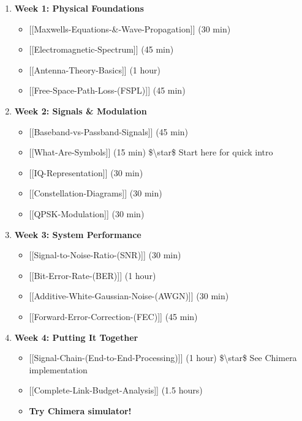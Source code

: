\begin{enumerate}
\def\labelenumi{\arabic{enumi}.}
\tightlist
\item
  \textbf{Week 1: Physical Foundations}

  \begin{itemize}
  \tightlist
  \item
    {[}{[}Maxwell\textquotesingle s-Equations-\&-Wave-Propagation{]}{]}
    (30 min)
  \item
    {[}{[}Electromagnetic-Spectrum{]}{]} (45 min)
  \item
    {[}{[}Antenna-Theory-Basics{]}{]} (1 hour)
  \item
    {[}{[}Free-Space-Path-Loss-(FSPL){]}{]} (45 min)
  \end{itemize}
\item
  \textbf{Week 2: Signals \& Modulation}

  \begin{itemize}
  \tightlist
  \item
    {[}{[}Baseband-vs-Passband-Signals{]}{]} (45 min)
  \item
    {[}{[}What-Are-Symbols{]}{]} (15 min) \$\textbackslash star\$ Start
    here for quick intro
  \item
    {[}{[}IQ-Representation{]}{]} (30 min)
  \item
    {[}{[}Constellation-Diagrams{]}{]} (30 min)
  \item
    {[}{[}QPSK-Modulation{]}{]} (30 min)
  \end{itemize}
\item
  \textbf{Week 3: System Performance}

  \begin{itemize}
  \tightlist
  \item
    {[}{[}Signal-to-Noise-Ratio-(SNR){]}{]} (30 min)
  \item
    {[}{[}Bit-Error-Rate-(BER){]}{]} (1 hour)
  \item
    {[}{[}Additive-White-Gaussian-Noise-(AWGN){]}{]} (30 min)
  \item
    {[}{[}Forward-Error-Correction-(FEC){]}{]} (45 min)
  \end{itemize}
\item
  \textbf{Week 4: Putting It Together}

  \begin{itemize}
  \tightlist
  \item
    {[}{[}Signal-Chain-(End-to-End-Processing){]}{]} (1 hour)
    \$\textbackslash star\$ See Chimera implementation
  \item
    {[}{[}Complete-Link-Budget-Analysis{]}{]} (1.5 hours)
  \item
    \textbf{Try Chimera simulator!}
  \end{itemize}
\end{enumerate}

